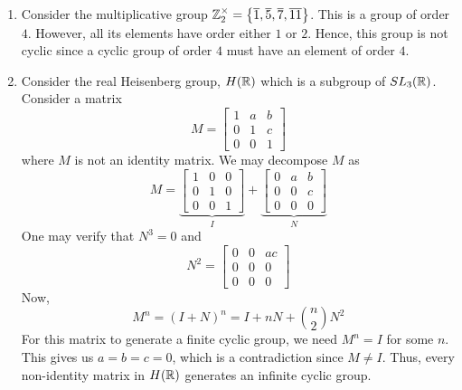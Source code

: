 \begin{ex} \phantom{hi}
\begin{enumerate}
    \item Consider the multiplicative group $\mathbb{Z}_2^{\times} = \left\{ \overline{1}, \overline{5}, \overline{7}, \overline{11} \right\}$. This is a group of order $4$. However, all its elements have order either $1$ or $2$. Hence, this group is not cyclic since a cyclic group of order $4$ must have an element of order $4$.
    
    \item Consider the real Heisenberg group, $H(\mathbb{R})$ which is a subgroup of $SL_3(\mathbb{R})$. Consider a matrix
\[
    M = \begin{bmatrix}
    1 & a & b \\
    0 & 1 & c \\
    0 & 0 & 1
    \end{bmatrix}
\]
where $M$ is not an identity matrix. We may decompose $M$ as
\[
    M = \underbrace{\begin{bmatrix}
    1 & 0 & 0 \\
    0 & 1 & 0 \\
    0 & 0 & 1
    \end{bmatrix}}_{I} + \underbrace{\begin{bmatrix}
    0 & a & b \\
    0 & 0 & c \\
    0 & 0 & 0
    \end{bmatrix}}_{N}
\]  
One may verify that $N^3 = 0$ and
\[
    N^2 = \begin{bmatrix}
    0 & 0 & ac \\
    0 & 0 & 0 \\
    0 & 0 & 0
    \end{bmatrix}
\]
Now, 
\[
    M^n = (I + N)^n = I + nN + \binom{n}{2} N^2 
\]
For this matrix to generate a finite cyclic group, we need $M^n = I$ for some $n$. This gives us $a = b = c = 0$, which is a contradiction since $M \neq I$. Thus, every non-identity matrix in $H(\mathbb{R})$ generates an infinite cyclic group.
\end{enumerate}
\end{ex}

